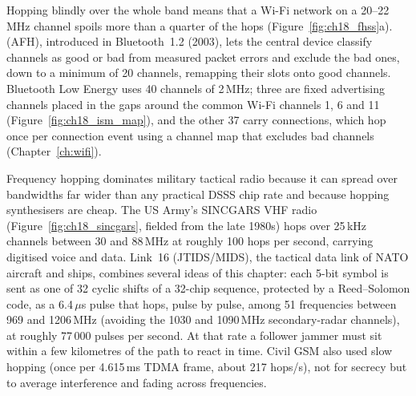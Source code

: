 Hopping blindly over the whole band means that a Wi-Fi network on a 20--22\,MHz channel
spoils more than a quarter of the hops (Figure~\ref{fig:ch18_fhss}a).  (AFH), introduced in Bluetooth~1.2 (2003), lets the central device classify
channels as good or bad from measured packet errors and exclude the bad ones, down to a
minimum of 20 channels, remapping their slots onto good channels. Bluetooth Low Energy uses
40 channels of 2\,MHz; three are fixed advertising channels placed in the gaps around the
common Wi-Fi channels 1, 6 and 11 (Figure~\ref{fig:ch18_ism_map}), and the other 37 carry
connections, which hop once per connection event using a channel map that excludes bad channels
(Chapter~\ref{ch:wifi}).


\begin{inpractice}
Frequency hopping dominates military tactical radio because it can spread over bandwidths
far wider than any practical DSSS chip rate and because hopping synthesisers are cheap.
The US Army's SINCGARS VHF radio (Figure~\ref{fig:ch18_sincgars}, fielded from the late 1980s)
hops over 25\,kHz channels between 30 and 88\,MHz at roughly 100 hops per second, carrying
digitised voice and data. Link~16 (JTIDS/MIDS), the tactical data link of NATO aircraft and ships,
combines several ideas of this chapter: each 5-bit symbol is sent as one of 32 cyclic shifts of a
32-chip sequence, protected by a Reed--Solomon code, as a 6.4\,$\mu$s pulse that hops, pulse by
pulse, among 51 frequencies between 969 and 1206\,MHz (avoiding the 1030 and 1090\,MHz
secondary-radar channels), at roughly 77\,000 pulses per second. At that rate a follower
jammer must sit within a few kilometres of the path to react in time. Civil GSM also used
slow hopping (once per 4.615\,ms TDMA frame, about 217 hops/s), not for secrecy but to
average interference and fading across frequencies.
\end{inpractice}



